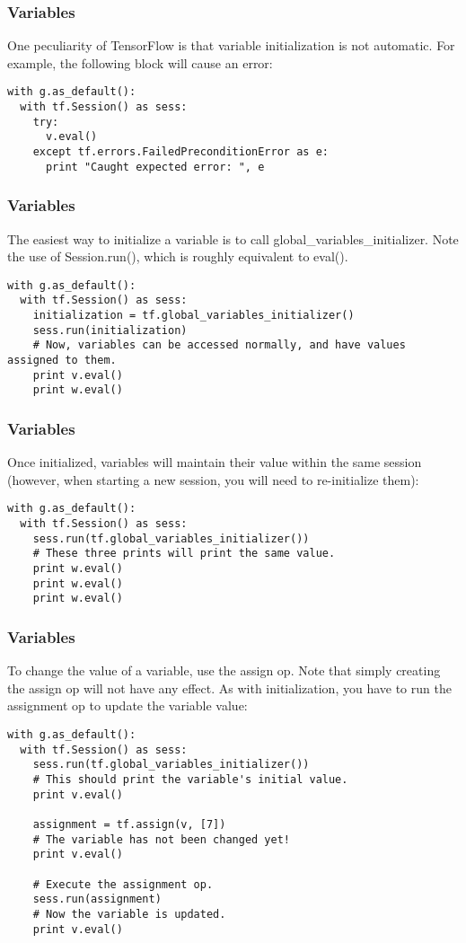 \begin{frame}[fragile] \frametitle{Variables}
One peculiarity of TensorFlow is that variable initialization is not automatic. For example, the following block will cause an error:
\begin{lstlisting}
with g.as_default():
  with tf.Session() as sess:
    try:
      v.eval()
    except tf.errors.FailedPreconditionError as e:
      print "Caught expected error: ", e
\end{lstlisting}
\end{frame}

\begin{frame}[fragile] \frametitle{Variables}
The easiest way to initialize a variable is to call global\_variables\_initializer. Note the use of Session.run(), which is roughly equivalent to eval().
\begin{lstlisting}
with g.as_default():
  with tf.Session() as sess:
    initialization = tf.global_variables_initializer()
    sess.run(initialization)
    # Now, variables can be accessed normally, and have values assigned to them.
    print v.eval()
    print w.eval()
\end{lstlisting}
\end{frame}

\begin{frame}[fragile] \frametitle{Variables}
Once initialized, variables will maintain their value within the same session (however, when starting a new session, you will need to re-initialize them):
\begin{lstlisting}
with g.as_default():
  with tf.Session() as sess:
    sess.run(tf.global_variables_initializer())
    # These three prints will print the same value.
    print w.eval()
    print w.eval()
    print w.eval()
\end{lstlisting}
\end{frame}

\begin{frame}[fragile] \frametitle{Variables}
To change the value of a variable, use the assign op. Note that simply creating the assign op will not have any effect. As with initialization, you have to run the assignment op to update the variable value:
\begin{lstlisting}
with g.as_default():
  with tf.Session() as sess:
    sess.run(tf.global_variables_initializer())
    # This should print the variable's initial value.
    print v.eval()

    assignment = tf.assign(v, [7])
    # The variable has not been changed yet!
    print v.eval()

    # Execute the assignment op.
    sess.run(assignment)
    # Now the variable is updated.
    print v.eval()
\end{lstlisting}
\end{frame}


